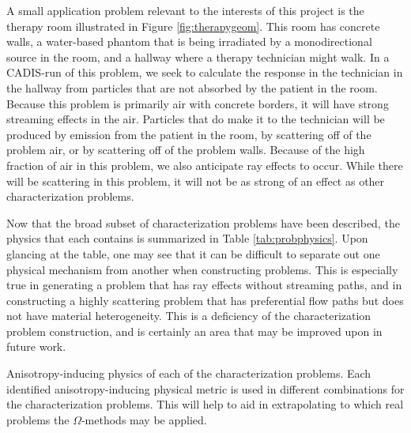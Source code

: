 A small application problem relevant to the interests of this project is the
therapy room illustrated in Figure \ref{fig:therapygeom}. This room has concrete
walls, a water-based phantom that is being irradiated by a monodirectional
source in the room, and a hallway where a therapy technician might walk. In a
CADIS-run of this problem, we seek to calculate the response in the
technician in the hallway from particles that are not absorbed by the patient in
the room. Because this problem is primarily air with concrete
borders, it will have strong streaming effects in the air. Particles that do
make it to the technician will be produced by emission from the patient in the
room, by scattering off of the problem air, or by scattering off of the problem
walls. Because of the high fraction of air in this problem, we also anticipate
ray effects to occur. While there will be scattering in this problem, it will
not be as strong of an effect as other characterization problems.

Now that the broad subset of characterization problems have been described,
the physics that each contains is summarized in Table \ref{tab:probphysics}.
Upon glancing at the table, one may see that it can be difficult to separate
out one physical mechanism from another when constructing problems. This is
especially true in generating a problem that has ray effects without streaming
paths, and in constructing a highly scattering problem that has preferential
flow paths but does not have material heterogeneity. This is a
deficiency of the characterization problem construction, and is certainly an
area that may be improved upon in future work.

\begin{table}[h!]
  \centering
  
  \caption[Anisotropy-inducing physics of each of the characterization problems.]
  {Anisotropy-inducing physics of each of the characterization problems.
  Each identified anisotropy-inducing physical metric is used in different
  combinations for the characterization problems. This will help to aid in
  extrapolating to which real problems the $\Omega$-methods may be applied.}
  \label{tab:probphysics}
\end{table}

